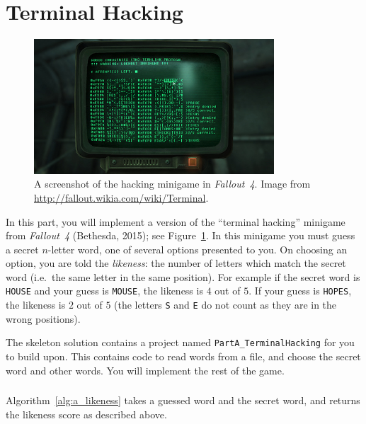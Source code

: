 \part{Terminal Hacking}

\begin{figure}
    \begin{center}
        \includegraphics[width=0.8\textwidth]{fallout_terminal.jpg}
    \end{center}
    \caption{A screenshot of the hacking minigame in \emph{Fallout~4}.
    Image from \protect\url{http://fallout.wikia.com/wiki/Terminal}.}
    \label{fig:fallout_terminal}
\end{figure}

In this part, you will implement a version of the ``terminal hacking'' minigame from \emph{Fallout~4} (Bethesda, 2015); see Figure~\ref{fig:fallout_terminal}.
In this minigame you must guess a secret $n$-letter word, one of several options presented to you.
On choosing an option, you are told the \emph{likeness}: the number of letters which match the secret word (i.e.\ the same letter in the same position).
For example if the secret word is \texttt{HOUSE} and your guess is \texttt{MOUSE}, the likeness is $4$ out of $5$.
If your guess is \texttt{HOPES}, the likeness is $2$ out of $5$ (the letters \texttt{S} and \texttt{E} do not count as they are in the wrong positions).

The skeleton solution contains a project named \texttt{PartA\_TerminalHacking} for you to build upon.
This contains code to read words from a file, and choose the secret word and other words.
You will implement the rest of the game.

\section{} \label{core-a-first}

Algorithm~\ref{alg:a_likeness} takes a guessed word and the secret word, and returns the likeness score as described above.

